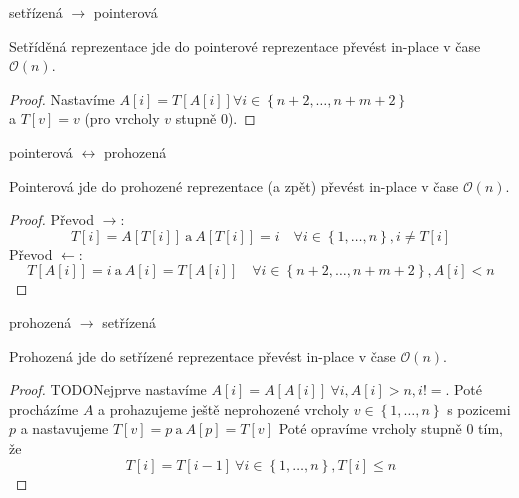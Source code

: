\documentclass{beamer}
\begin{document}
	\begin{frame}{setřízená $\rightarrow$ pointerová}
		\begin{lemma}
			Setříděná reprezentace jde do pointerové reprezentace převést in-place v čase $\mathcal{O}\left(n\right)$.
		\end{lemma}

		\begin{proof}
			Nastavíme $A[i] = T\left[A\left[i\right]\right] \forall i \in \left\{n + 2, \ldots, n + m + 2\right\}$ \\
			a $T\left[v\right] = v$ (pro vrcholy $v$ stupně $0$).
		\end{proof}
	\end{frame}

	\begin{frame}{pointerová $\longleftrightarrow$ prohozená}
		\begin{lemma}
			Pointerová jde do prohozené reprezentace (a zpět) převést in-place v čase $\mathcal{O}\left(n\right)$.
		\end{lemma}

		\begin{proof}
			Převod $\rightarrow$: $$T[i] = A[T[i]]\ \text{a}\ A[T[i]] = i\quad \forall i \in \left\{1, \ldots, n\right\}, i \neq T[i]$$
			Převod $\leftarrow$: $$T[A[i]] = i\ \text{a}\ A[i] = T[A[i]]\quad \forall i \in \left\{n + 2, \ldots, n + m + 2\right\}, A[i] < n$$
		\end{proof}
	\end{frame}

	\begin{frame}{prohozená $\rightarrow$ setřízená}
		\begin{lemma}
			Prohozená jde do setřízené reprezentace převést in-place v čase $\mathcal{O}\left(n\right)$.
		\end{lemma}

		\begin{proof}
			TODONejprve nastavíme $A[i] = A[A[i]]\ \forall i, A[i] > n, i !=$.
			\vfill
			Poté procházíme $A$ a prohazujeme ještě neprohozené vrcholy $v \in \left\{1, \ldots, n\right\}$ s pozicemi $p$ a nastavujeme $T[v] = p\ \text{a}\ A[p] = T[v]$
			Poté opravíme vrcholy stupně $0$ tím, že 
			$$T[i] = T[i - 1]\ \forall i \in \left\{1, \ldots, n\right\}, T[i] \le n$$

		\end{proof}
	\end{frame}
\end{document}
